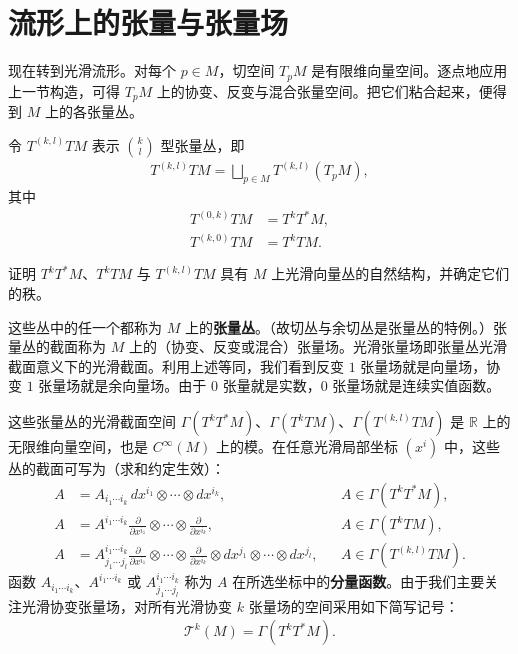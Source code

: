 \documentclass[../../main.tex]{subfiles}
\begin{document}
\section{流形上的张量与张量场}\label{section:ch12-流形上张量}

现在转到光滑流形。对每个 $p\in M$，切空间 $T_pM$ 是有限维向量空间。逐点地应用上一节构造，可得 $T_pM$ 上的协变、反变与混合张量空间。把它们粘合起来，便得到 $M$ 上的各张量丛。

令 $T^{(k,l)}TM$ 表示 $\binom{k}{l}$ 型张量丛，即
\begin{align*}
T^{(k,l)}TM=\bigsqcup_{p\in M}T^{(k,l)}(T_pM),
\end{align*}
其中
\begin{align*}
T^{(0,k)}TM&=T^kT^*M,\\
T^{(k,0)}TM&=T^kTM.
\end{align*}

\begin{exercise}\label{exercise:ch12-18}
证明 $T^kT^*M$、$T^kTM$ 与 $T^{(k,l)}TM$ 具有 $M$ 上光滑向量丛的自然结构，并确定它们的秩。
\end{exercise}

这些丛中的任一个都称为 $M$ 上的\textbf{张量丛}。（故切丛与余切丛是张量丛的特例。）张量丛的截面称为 $M$ 上的（协变、反变或混合）张量场。光滑张量场即张量丛光滑截面意义下的光滑截面。利用上述等同，我们看到反变 $1$ 张量场就是向量场，协变 $1$ 张量场就是余向量场。由于 $0$ 张量就是实数，$0$ 张量场就是连续实值函数。

这些张量丛的光滑截面空间 $\Gamma(T^kT^*M)$、$\Gamma(T^kTM)$、$\Gamma(T^{(k,l)}TM)$ 是 $\mathbb{R}$ 上的无限维向量空间，也是 $C^\infty(M)$ 上的模。在任意光滑局部坐标 $(x^i)$ 中，这些丛的截面可写为（求和约定生效）：
\begin{align*}
A&=A_{i_1\cdots  i_k}\,dx^{i_1}\otimes\cdots\otimes dx^{i_k}, && A\in\Gamma(T^kT^*M),\\
A&=A^{i_1\cdots  i_k}\frac{\partial}{\partial x^{i_1}}\otimes\cdots\otimes\frac{\partial}{\partial x^{i_k}}, && A\in\Gamma(T^kTM),\\
A&=A^{i_1\cdots  i_k}_{j_1\cdots  j_l}\frac{\partial}{\partial x^{i_1}}\otimes\cdots\otimes\frac{\partial}{\partial x^{i_k}}\otimes dx^{j_1}\otimes\cdots\otimes dx^{j_l}, && A\in\Gamma(T^{(k,l)}TM).
\end{align*}
函数 $A_{i_1\cdots  i_k}$、$A^{i_1\cdots  i_k}$ 或 $A^{i_1\cdots  i_k}_{j_1\cdots  j_l}$ 称为 $A$ 在所选坐标中的\textbf{分量函数}。由于我们主要关注光滑协变张量场，对所有光滑协变 $k$ 张量场的空间采用如下简写记号：
\begin{align*}
\mathcal T^k(M)=\Gamma(T^kT^*M).
\end{align*}
\end{document}
